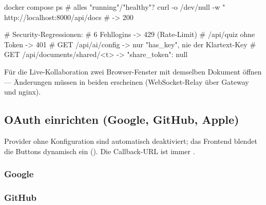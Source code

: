 \begin{syntaxbox}[bash]
docker compose ps                       # alles "running"/"healthy"?
curl -o /dev/null -w "%
  http://localhost:8000/api/docs        # -> 200

# Security-Regressionen:
# 6 Fehllogins -> 429 (Rate-Limit)
# /api/quiz ohne Token -> 401
# GET /api/ai/config -> nur "has_key", nie der Klartext-Key
# GET /api/documents/shared/<t> -> "share_token": null
\end{syntaxbox}

Für die Live-Kollaboration zwei Browser-Fenster mit demselben Dokument
öffnen — Änderungen müssen in beiden erscheinen (WebSocket-Relay über
Gateway und nginx).

\subsection{OAuth einrichten (Google, GitHub, Apple)}

Provider ohne Konfiguration sind automatisch deaktiviert; das Frontend blendet
die Buttons dynamisch ein (). Die
Callback-URL ist immer
.

\subsubsection{Google}
\begin{process}
\end{process}

\subsubsection{GitHub}
\begin{process}
\end{process}


